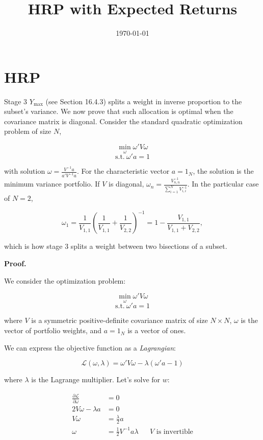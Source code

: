 \documentclass[12pt]{article}
\title{HRP with Expected Returns}
\date{\today}
\begin{document}
\maketitle

\section*{HRP}

Stage 3 $Y_{\max}$ (see Section 16.4.3) splits a weight in inverse proportion to the subset’s variance. We now prove that such allocation is optimal when the covariance matrix is diagonal. Consider the standard quadratic optimization problem of size $N$,

\[
\min_{\omega} \omega' V \omega
\]
\[
\text{s.t.} \ \omega' a = 1
\]

with solution $\omega = \frac{V^{-1} a}{a' V^{-1} a}$. For the characteristic vector $a = 1_N$, the solution is the minimum variance portfolio. If $V$ is diagonal, $\omega_n = \frac{V^{-1}_{n,n}}{\sum_{i=1}^{N} V^{-1}_{i,i}}$. In the particular case of $N = 2$,

\[
\omega_1 = \frac{1}{V_{1,1}} \left( \frac{1}{V_{1,1}} + \frac{1}{V_{2,2}} \right)^{-1} = 1 - \frac{V_{1,1}}{V_{1,1} + V_{2,2}},
\]

which is how stage 3 splits a weight between two bisections of a subset.

\textbf{Proof.}

We consider the optimization problem:

\[
\min_{\omega} \omega' V \omega
\]
\[
\text{s.t.} \ \omega' a = 1
\]

where \( V \) is a symmetric positive-definite covariance matrix of size \( N \times N \), \( \omega \) is the vector of portfolio weights, and \( a = 1_N \) is a vector of ones.

We can express the objective function as a \textit{Lagrangian}:

$$
\mathcal{L}(\omega, \lambda) = \omega' V \omega - \lambda (\omega' a - 1)
$$

where \( \lambda \) is the Lagrange multiplier. Let's solve for $w$:


\begin{align*}
\frac{\partial \mathcal{L}}{\partial \omega} 
&= 0\\
2V \omega - \lambda a &= 0\\
V \omega &= \frac{\lambda}{2} a\\
\omega &= \frac{1}{2} V^{-1} a \lambda && V \text{ is invertible}
\end{align*}
\end{document}
